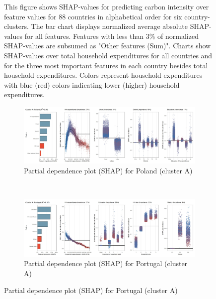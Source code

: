 \begin{figure}[ht!]
    \begin{subcaption2}
     This figure shows SHAP-values for predicting carbon intensity over feature values for 88 countries in alphabetical order for six country-clusters. The bar chart displays normalized average absolute SHAP-values for all features. Features with less than 3\% of normalized SHAP-values are subsumed as "Other features (Sum)". Charts show SHAP-values over total household expenditures for all countries and for the three most important features in each country besides total household expenditures. Colors represent household expenditures with blue (red) colors indicating lower (higher) household expenditures.
     \end{subcaption2}
\end{figure}

\begin{figure}[ht!]\ContinuedFloat
    \centering
   \begin{subfigure}[b]{\textwidth}
   \centering
         \caption{Partial dependence plot (SHAP) for Poland (cluster A)}
         \label{fig:5b_POL}
         \includegraphics[width=\textwidth]{Figure 5b/Figure_5b_POL}         
     \end{subfigure}
    \\
    \vspace{0.5cm}
    \begin{subfigure}[b]{\textwidth}
   \centering
         \caption{Partial dependence plot (SHAP) for Portugal (cluster A)}
         \label{fig:5b_PRT}
         \includegraphics[width=\textwidth]{Figure 5b/Figure_5b_PRT}
         \end{subfigure}

\end{figure}
